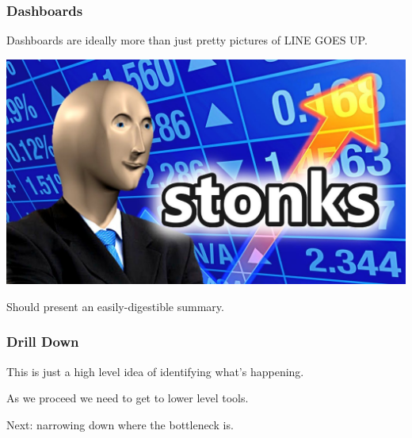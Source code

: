 \begin{frame}
\frametitle{Dashboards}

Dashboards are ideally more than just pretty pictures of LINE GOES UP.

\begin{center}
	\includegraphics[width=\textwidth]{images/stonks.jpg}
\end{center}

Should present an easily-digestible summary.

\end{frame}


\begin{frame}
\frametitle{Drill Down}

This is just a high level idea of identifying what's happening.

As we proceed we need to get to lower level tools.

Next: narrowing down where the bottleneck is.

\end{frame}








